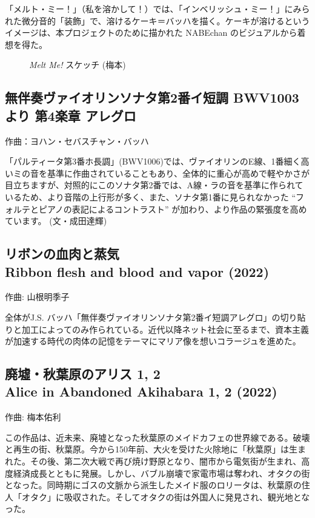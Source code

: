 \documentclass[a6paper, 9pt, openright, titlepage, twoside]{ltjsarticle}
\begin{document}
「メルト・ミー！」（私を溶かして！）では、「インベリッシュ・ミー！」にみられた微分音的「装飾」で、溶けるケーキ＝バッハを描く。ケーキが溶けるというイメージは、本プロジェクトのために描かれた NABEchan のビジュアルから着想を得た。




\begin{figure}[h]
\centering
{} 
\caption*{{\itshape Melt Me!} スケッチ (梅本)}
\end{figure}


\subsection*{
無伴奏ヴァイオリンソナタ第2番イ短調 BWV1003より 第4楽章 アレグロ
}\label{bwv1003}
{\small 作曲：ヨハン・セバスチャン・バッハ}

「パルティータ第3番ホ長調」(BWV1006)では、ヴァイオリンのE線、1番細く高いミの音を基準に作曲されていることもあり、全体的に重心が高めで軽やかさが目立ちますが、対照的にこのソナタ第2番では、A線・ラの音を基準に作られているため、より音階の上行形が多く、また、ソナタ第1番に見られなかった ``フォルテとピアノの表記によるコントラスト'' が加わり、より作品の緊張度を高めています。 (文・成田達輝)


\subsection*{
リボンの血肉と蒸気 \\
Ribbon flesh and blood and vapor (2022) }\label{ribbonflesh}
{\small 作曲: 山根明季子}

全体がJ.S. バッハ「無伴奏ヴァイオリンソナタ第2番イ短調アレグロ」の切り貼りと加工によってのみ作られている。近代以降ネット社会に至るまで、資本主義が加速する時代の肉体の記憶をテーマにマリア像を想いコラージュを進めた。



\subsection*{
廃墟・秋葉原のアリス 1, 2 \\
Alice in Abandoned Akihabara 1, 2 (2022) }\label{alice}
{\small 作曲: 梅本佑利}

この作品は、近未来、廃墟となった秋葉原のメイドカフェの世界線である。破壊と再生の街、秋葉原。今から150年前、大火を受けた火除地に「秋葉原」は生まれた。その後、第二次大戦で再び焼け野原となり、闇市から電気街が生まれ、高度経済成長とともに発展。しかし、バブル崩壊で家電市場は奪われ、オタクの街となった。同時期にゴスの文脈から派生したメイド服のロリータは、秋葉原の住人「オタク」に吸収された。そしてオタクの街は外国人に発見され、観光地となった。
\end{document}
